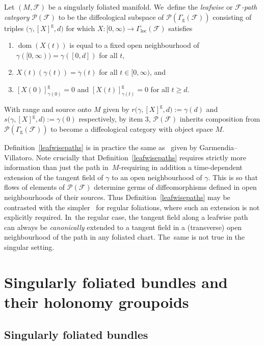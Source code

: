 \documentclass[11pt]{article}
\numberwithin{equation}{section}
\numberwithin{equation}{section}
\def\loc{\operatorname{loc}}
\def\g{\operatorname{g}}
\def\dom{\operatorname{dom}}
\def\FF{{\mathcal{F}}}
\def\PP{{\mathcal{P}}}
\begin{document}
\begin{Definition}\label{leafwisepaths}
Let $(M,\FF)$ be a singularly foliated manifold. We~define the \textit{leafwise} or \textit{$\FF$-path category} $\PP(\FF)$ to be the diffeological subspace of $\PP(\Gamma_{\g}(\FF))$ consisting of triples $\big(\gamma,[X]^{\g},d\big)$ for which $X\colon [0,\infty)\rightarrow\Gamma_{\loc}(\FF)$ satisfies
\begin{enumerate}\itemsep=0pt
\item[(1)] $\dom(X(t))$ is equal to a fixed open neighbourhood of $\gamma([0,\infty)) = \gamma([0,d])$ for all $t$,
\item[(2)] $X(t)(\gamma(t)) = \dot{\gamma}(t)$ for all $t\in[0,\infty)$, and
\item[(3)] $[X(0)]^{\g}_{\gamma(0)} = 0$ and $[X(t)]^{\g}_{\gamma(t)} = 0$ for all $t\geq d$.
\end{enumerate}
With range and source onto $M$ given by $r\big(\gamma,[X]^{\g},d\big):=\gamma(d)$ and $s\big(\gamma,[X]^{\g},d\big):=\gamma(0)$ respectively, by item 3, $\PP(\FF)$ inherits composition from $\PP(\Gamma_{\g}(\FF))$ to become a diffeological category with object space $M$.
\end{Definition}

Definition~\ref{leafwisepaths} is in practice the same as~\cite[Definition~3.1]{VilGar1} given by Garmendia--Villatoro. Note crucially that Definition~\ref{leafwisepaths} requires strictly more information than just the path in~$M$-re\-quiring in addition a time-dependent extension of the tangent field of $\gamma$ to an open neighbourhood of $\gamma$. This is so that flows of elements of $\PP(\FF)$ determine germs of diffeomorphisms defined in open neighbourhoods of their sources. Thus Definition~\ref{leafwisepaths} may be contrasted with the simpler~\cite[Definition~3.23]{mac3} for regular foliations, where such an extension is not explicitly required. In~the regular case, the tangent field along a leafwise path can always be \textit{canonically} extended to a tangent field in a (transverse) open neighbourhood of the path in any foliated chart. The~same is not true in the singular setting.


\section{Singularly foliated bundles and their holonomy groupoids}\label{sec4}

\subsection{Singularly foliated bundles}
\end{document}
